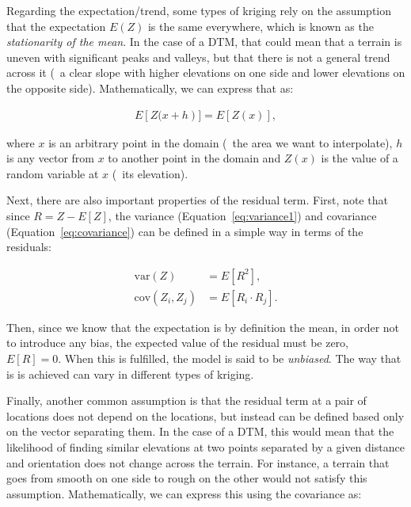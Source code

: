 Regarding the expectation/trend, some types of kriging rely on the assumption that the expectation \(E(Z)\) is the same everywhere, which is known as the \emph{stationarity of the mean}.
In the case of a DTM, that could mean that a terrain is uneven with significant peaks and valleys, but that there is not a general trend across it (\eg\ a clear slope with higher elevations on one side and lower elevations on the opposite side).
Mathematically, we can express that as:

\begin{align}
\label{eq:stationarityofthemean}
E\left[Z(x+h\right)] = E\left[Z(x)\right],
\end{align}

where \(x\) is an arbitrary point in the domain (\ie\ the area we want to interpolate), \(h\) is any vector from \(x\) to another point in the domain and \(Z(x)\) is the value of a random variable at \(x\) (\eg\ its elevation).

Next, there are also important properties of the residual term.
First, note that since \(R = Z - E[Z] \), the variance (Equation~\ref{eq:variance1}) and covariance (Equation~\ref{eq:covariance}) can be defined in a simple way in terms of the residuals:

\begin{align}
\mathrm{var}\left(Z\right) &= E\left[{R}^2\right], \label{eq:varres} \\
\mathrm{cov}(Z_i,Z_j) &= E\left[R_i \cdot R_j\right]. \label{eq:covres}
\end{align}

Then, since we know that the expectation is by definition the mean, in order not to introduce any bias, the expected value of the residual must be zero, \ie\ \(E\left[R\right] = 0\).
When this is fulfilled, the model is said to be \emph{unbiased}.
The way that is is achieved can vary in different types of kriging.

Finally, another common assumption is that the residual term at a pair of locations does not depend on the locations, but instead can be defined based only on the vector separating them.
In the case of a DTM, this would mean that the likelihood of finding similar elevations at two points separated by a given distance and orientation does not change across the terrain.
For instance, a terrain that goes from smooth on one side to rough on the other would not satisfy this assumption.
Mathematically, we can express this using the covariance as:

